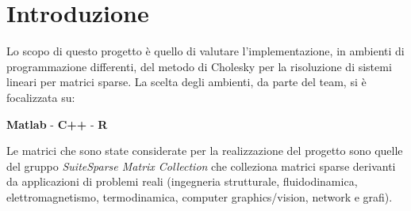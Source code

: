 \documentclass[preprint,12pt]{elsarticle}
\begin{document}
\begin{frontmatter}
\begin{abstract}
Lo scopo di questo progetto è di studiare l'implementazione in ambienti di programmazione open source del metodo di \textbf{Cholesky} per la risoluzione sistemi lineari per matrici sparse, simmetriche e definite positive e successivamente confrontarli con l’implementazione nell'ambiente di programmazione di Matlab.
	
Immaginiamo che un'azienda abbia la necessità di munirsi di un ambiente di programmazione per risolvere sistemi lineari con matrici sparse e definite positive di grandi dimensioni utilizzando il metodo di Cholesky. 
	
L'alternativa è tra software proprietario (Matlab) oppure open source e anche tra Windows oppure Linux.
	
La richiesta è quindi quella di confrontare, in ambiente Linux e Windows, e sulla stessa macchina, l'ambiente di programmazione Matlab con una libreria open source. 
	
In altre parole bisogna porsi le seguenti domande:
\begin{enumerate}
		\item \`E meglio affidarsi alla sicurezza di Matlab pagando oppure vale la pena di avventurarsi nel mondo open source? 
		\item \`E meglio lavorare in ambiente Linux oppure in ambiente Windows?
\end{enumerate}
\end{abstract}
	


\end{frontmatter}


\newpage

\section{Introduzione}

Lo scopo di questo progetto è quello di valutare l’implementazione, in ambienti di programmazione differenti, del metodo di Cholesky per la risoluzione di sistemi lineari per matrici sparse. La scelta degli ambienti, da parte del team, si è focalizzata su:

\begin{center}
	\textbf{Matlab} \quad - \quad \textbf{C++} \quad - \quad \textbf{R}
\end{center}

Le matrici che sono state considerate per la realizzazione del progetto sono quelle del gruppo \textit{SuiteSparse Matrix Collection} che colleziona matrici sparse derivanti da applicazioni di problemi reali (ingegneria strutturale, fluidodinamica, elettromagnetismo, termodinamica, computer graphics/vision, network e grafi).
\end{document}
